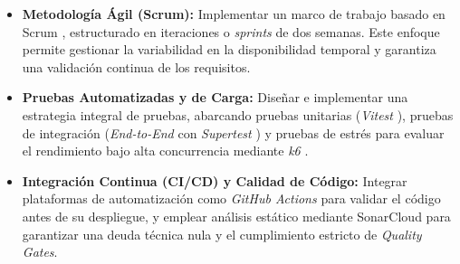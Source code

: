 \begin{itemize}
    \item \textbf{Metodología Ágil (Scrum):} Implementar un marco de trabajo basado en Scrum \cite{scrum}, estructurado en iteraciones o \textit{sprints} de dos semanas. Este enfoque permite gestionar la variabilidad en la disponibilidad temporal y garantiza una validación continua de los requisitos.
    \item \textbf{Pruebas Automatizadas y de Carga:} Diseñar e implementar una estrategia integral de pruebas, abarcando pruebas unitarias (\textit{Vitest} \cite{vitest}), pruebas de integración (\textit{End-to-End} con \textit{Supertest} \cite{supertest}) y pruebas de estrés para evaluar el rendimiento bajo alta concurrencia mediante \textit{k6} \cite{k6}.
    \item \textbf{Integración Continua (CI/CD) y Calidad de Código:} Integrar plataformas de automatización como \textit{GitHub Actions} \cite{githubactions} para validar el código antes de su despliegue, y emplear análisis estático mediante SonarCloud \cite{sonarqube} para garantizar una deuda técnica nula y el cumplimiento estricto de \textit{Quality Gates}.
\end{itemize}
